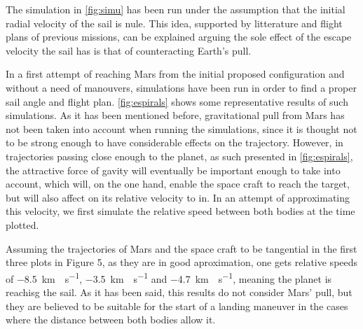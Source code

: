 \documentclass[twocolumn,12pt,a4paper]{article}
\numberwithin{equation}{section}
\begin{document}
 
The simulation in  \autoref{fig:simu} has been run under the assumption that the initial radial velocity of the sail is nule. This idea, supported by litterature and flight plans of previous missions, can be explained arguing the sole effect of the escape velocity the sail has is that of counteracting Earth's pull.


In a first attempt of reaching Mars from the initial proposed configuration and without a need of manouvers, simulations have been run in order to find a proper sail angle and flight plan. \autoref{fig:espirals} shows some representative results of such simulations. As it has been mentioned before, gravitational pull from Mars has not been taken into account when running the simulations, since it is thought not to be strong enough to have considerable effects on the trajectory. However, in trajectories passing close enough to the planet, as such presented in \autoref{fig:espirals}, the attractive force of gavity will eventually be important enough to take into account, which will, on the one hand, enable the space craft to reach the target, but will also affect on its relative velocity to in. In an attempt of approximating this velocity, we first simulate the relative speed between both bodies at the time plotted.

Assuming the trajectories of Mars and the space craft to be tangential in the first three plots in Figure 5, as they are in good aproximation, one gets relative speeds of \SI{-8,5}{km\cdot s^{-1}}, \SI{-3.5}{km\cdot s^{-1}}  and \SI{-4.7}{km\cdot s^{-1}}, meaning the planet is reachisg the sail. As it has been said, this results do not consider Mars' pull,  but they are believed to be suitable for the start of a landing maneuver in the cases where the distance between both bodies allow it.
\end{document}
